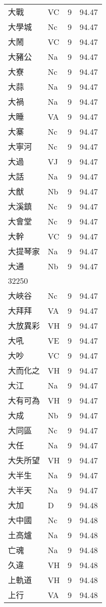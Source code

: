 \documentclass[twocolumn]{book}
\begin{document}
\begin{supertabular}{llrr}
大戰 & VC & 9 &  94.47\\
大學城 & Nc & 9 &  94.47\\
大鬧 & VC & 9 &  94.47\\
大豬公 & Na & 9 &  94.47\\
大寮 & Nc & 9 &  94.47\\
大蒜 & Na & 9 &  94.47\\
大禍 & Na & 9 &  94.47\\
大睡 & VA & 9 &  94.47\\
大寨 & Nc & 9 &  94.47\\
大寧河 & Nc & 9 &  94.47\\
大過 & VJ & 9 &  94.47\\
大話 & Na & 9 &  94.47\\
大猷 & Nb & 9 &  94.47\\
大溪鎮 & Nc & 9 &  94.47\\
大會堂 & Nc & 9 &  94.47\\
大幹 & VC & 9 &  94.47\\
大提琴家 & Na & 9 &  94.47\\
大通 & Nb & 9 &  94.47\\
32250\\
大峽谷 & Nc & 9 &  94.47\\
大拜拜 & VA & 9 &  94.47\\
大放異彩 & VH & 9 &  94.47\\
大吼 & VE & 9 &  94.47\\
大吵 & VC & 9 &  94.47\\
大而化之 & VH & 9 &  94.47\\
大江 & Na & 9 &  94.47\\
大有可為 & VH & 9 &  94.47\\
大成 & Nb & 9 &  94.47\\
大同區 & Nc & 9 &  94.47\\
大任 & Na & 9 &  94.47\\
大失所望 & VH & 9 &  94.47\\
大半生 & Na & 9 &  94.47\\
大半天 & Na & 9 &  94.47\\
大加 & D & 9 &  94.48\\
大中國 & Nc & 9 &  94.48\\
土高爐 & Na & 9 &  94.48\\
亡魂 & Na & 9 &  94.48\\
久違 & VH & 9 &  94.48\\
上軌道 & VH & 9 &  94.48\\
上行 & VA & 9 &  94.48\\

\end{supertabular}
\end{document}
